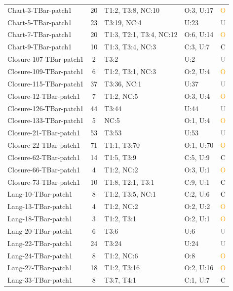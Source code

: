 \begin{longtable}{l|c|l|l|c}
Chart-3-TBar-patch1 & 20 & T1:2, T3:8, NC:10 & O:3, U:17 & \textcolor{orange}{O} \\
Chart-5-TBar-patch1 & 23 & T3:19, NC:4 & U:23 & \textcolor{gray}{U} \\
Chart-7-TBar-patch1 & 20 & T1:3, T2:1, T3:4, NC:12 & O:6, U:14 & \textcolor{orange}{O} \\
Chart-9-TBar-patch1 & 10 & T1:3, T3:4, NC:3 & C:3, U:7 & \textcolor{green!60!black}{C} \\
Closure-107-TBar-patch1 & 2 & T3:2 & U:2 & \textcolor{gray}{U} \\
Closure-109-TBar-patch1 & 6 & T1:2, T3:1, NC:3 & O:2, U:4 & \textcolor{orange}{O} \\
Closure-115-TBar-patch1 & 37 & T3:36, NC:1 & U:37 & \textcolor{gray}{U} \\
Closure-12-TBar-patch1 & 7 & T1:2, NC:5 & O:3, U:4 & \textcolor{orange}{O} \\
Closure-126-TBar-patch1 & 44 & T3:44 & U:44 & \textcolor{gray}{U} \\
Closure-133-TBar-patch1 & 5 & NC:5 & O:1, U:4 & \textcolor{orange}{O} \\
Closure-21-TBar-patch1 & 53 & T3:53 & U:53 & \textcolor{gray}{U} \\
Closure-22-TBar-patch1 & 71 & T1:1, T3:70 & O:1, U:70 & \textcolor{orange}{O} \\
Closure-62-TBar-patch1 & 14 & T1:5, T3:9 & C:5, U:9 & \textcolor{green!60!black}{C} \\
Closure-66-TBar-patch1 & 4 & T1:2, NC:2 & O:3, U:1 & \textcolor{orange}{O} \\
Closure-73-TBar-patch1 & 10 & T1:8, T2:1, T3:1 & C:9, U:1 & \textcolor{green!60!black}{C} \\
Lang-10-TBar-patch1 & 8 & T1:2, T3:5, NC:1 & C:2, U:6 & \textcolor{green!60!black}{C} \\
Lang-13-TBar-patch1 & 4 & T1:2, NC:2 & O:2, U:2 & \textcolor{orange}{O} \\
Lang-18-TBar-patch1 & 3 & T1:2, T3:1 & O:2, U:1 & \textcolor{orange}{O} \\
Lang-20-TBar-patch1 & 6 & T3:6 & U:6 & \textcolor{gray}{U} \\
Lang-22-TBar-patch1 & 24 & T3:24 & U:24 & \textcolor{gray}{U} \\
Lang-24-TBar-patch1 & 8 & T1:2, NC:6 & O:8 & \textcolor{orange}{O} \\
Lang-27-TBar-patch1 & 18 & T1:2, T3:16 & O:2, U:16 & \textcolor{orange}{O} \\
Lang-33-TBar-patch1 & 8 & T3:7, T4:1 & C:1, U:7 & \textcolor{green!60!black}{C} \\

\end{longtable}
